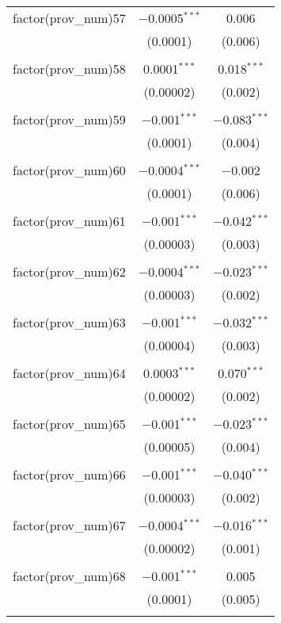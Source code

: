 \begin{table}[ht!]
\begin{tabular}{@{\extracolsep{5pt}}lcc}
 factor(prov\_num)57 & $-$0.0005$^{***}$ & 0.006 \\ 
  & (0.0001) & (0.006) \\ 
  & & \\ 
 factor(prov\_num)58 & 0.0001$^{***}$ & 0.018$^{***}$ \\ 
  & (0.00002) & (0.002) \\ 
  & & \\ 
 factor(prov\_num)59 & $-$0.001$^{***}$ & $-$0.083$^{***}$ \\ 
  & (0.0001) & (0.004) \\ 
  & & \\ 
 factor(prov\_num)60 & $-$0.0004$^{***}$ & $-$0.002 \\ 
  & (0.0001) & (0.006) \\ 
  & & \\ 
 factor(prov\_num)61 & $-$0.001$^{***}$ & $-$0.042$^{***}$ \\ 
  & (0.00003) & (0.003) \\ 
  & & \\ 
 factor(prov\_num)62 & $-$0.0004$^{***}$ & $-$0.023$^{***}$ \\ 
  & (0.00003) & (0.002) \\ 
  & & \\ 
 factor(prov\_num)63 & $-$0.001$^{***}$ & $-$0.032$^{***}$ \\ 
  & (0.00004) & (0.003) \\ 
  & & \\ 
 factor(prov\_num)64 & 0.0003$^{***}$ & 0.070$^{***}$ \\ 
  & (0.00002) & (0.002) \\ 
  & & \\ 
 factor(prov\_num)65 & $-$0.001$^{***}$ & $-$0.023$^{***}$ \\ 
  & (0.00005) & (0.004) \\ 
  & & \\ 
 factor(prov\_num)66 & $-$0.001$^{***}$ & $-$0.040$^{***}$ \\ 
  & (0.00003) & (0.002) \\ 
  & & \\ 
 factor(prov\_num)67 & $-$0.0004$^{***}$ & $-$0.016$^{***}$ \\ 
  & (0.00002) & (0.001) \\ 
  & & \\ 
 factor(prov\_num)68 & $-$0.001$^{***}$ & 0.005 \\ 
  & (0.0001) & (0.005) \\ 
  & & \\ 

\end{tabular}
\end{table}
